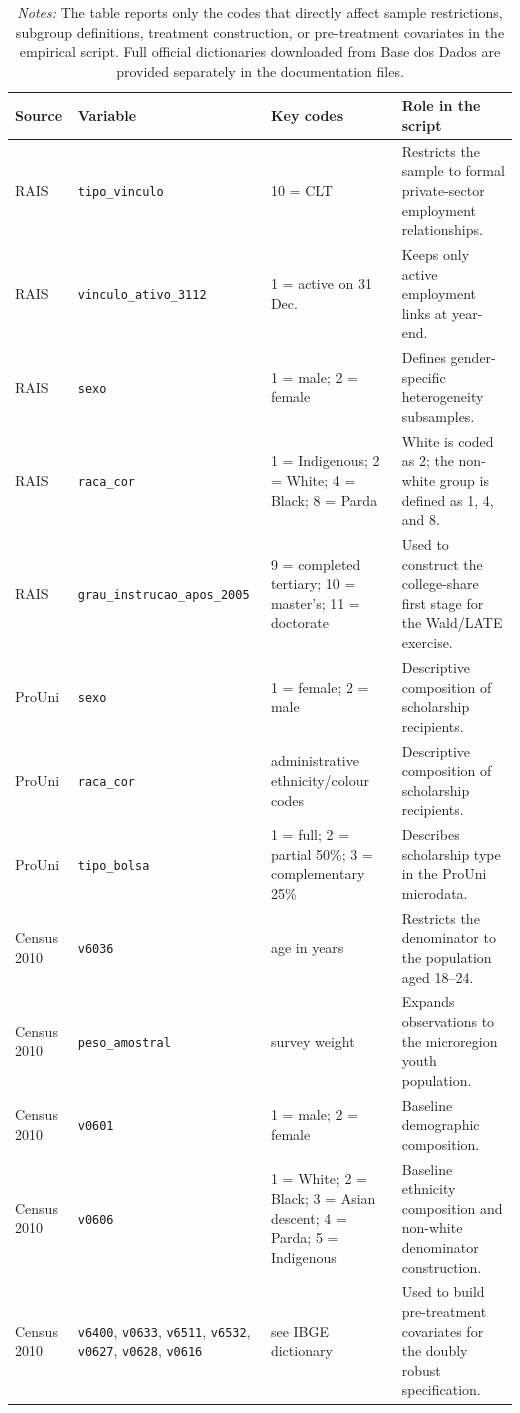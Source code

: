 \begin{table}[H]
\centering
\caption{Principal administrative codes used in variable construction}
\label{tab:key_codes_script}
\begin{tabular}{p{2.5cm} p{3.6cm} p{2.3cm} p{6.6cm}}
\toprule
\textbf{Source} & \textbf{Variable} & \textbf{Key codes} & \textbf{Role in the script} \\
\midrule
RAIS & \texttt{tipo\_vinculo} & 10 = CLT & Restricts the sample to formal private-sector employment relationships. \\
RAIS & \texttt{vinculo\_ativo\_3112} & 1 = active on 31 Dec. & Keeps only active employment links at year-end. \\
RAIS & \texttt{sexo} & 1 = male; 2 = female & Defines gender-specific heterogeneity subsamples. \\
RAIS & \texttt{raca\_cor} & 1 = Indigenous; 2 = White; 4 = Black; 8 = Parda & White is coded as 2; the non-white group is defined as 1, 4, and 8. \\
RAIS & \texttt{grau\_instrucao\_apos\_2005} & 9 = completed tertiary; 10 = master's; 11 = doctorate & Used to construct the college-share first stage for the Wald/LATE exercise. \\
ProUni & \texttt{sexo} & 1 = female; 2 = male & Descriptive composition of scholarship recipients. \\
ProUni & \texttt{raca\_cor} & administrative ethnicity/colour codes & Descriptive composition of scholarship recipients. \\
ProUni & \texttt{tipo\_bolsa} & 1 = full; 2 = partial 50\%; 3 = complementary 25\% & Describes scholarship type in the ProUni microdata. \\
Census 2010 & \texttt{v6036} & age in years & Restricts the denominator to the population aged 18--24. \\
Census 2010 & \texttt{peso\_amostral} & survey weight & Expands observations to the microregion youth population. \\
Census 2010 & \texttt{v0601} & 1 = male; 2 = female & Baseline demographic composition. \\
Census 2010 & \texttt{v0606} & 1 = White; 2 = Black; 3 = Asian descent; 4 = Parda; 5 = Indigenous & Baseline ethnicity composition and non-white denominator construction. \\
Census 2010 & \texttt{v6400}, \texttt{v0633}, \texttt{v6511}, \texttt{v6532}, \texttt{v0627}, \texttt{v0628}, \texttt{v0616} & see IBGE dictionary & Used to build pre-treatment covariates for the doubly robust specification. \\
\bottomrule
\end{tabular}
\caption*{\footnotesize \textit{Notes:} The table reports only the codes that directly affect sample restrictions, subgroup definitions, treatment construction, or pre-treatment covariates in the empirical script. Full official dictionaries downloaded from Base dos Dados are provided separately in the documentation files.}
\end{table}


